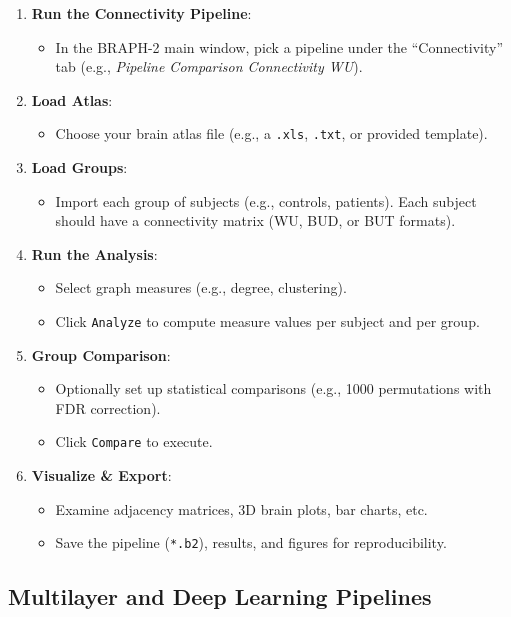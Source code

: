 \documentclass[justified]{tufte-handout}
\begin{document}
\begin{enumerate}
    \item \textbf{Run the Connectivity Pipeline}:
    \begin{itemize}
        \item In the BRAPH-2 main window, pick a pipeline under the ``Connectivity'' tab (e.g., \textit{Pipeline Comparison Connectivity WU}).
    \end{itemize}
    \item \textbf{Load Atlas}:
    \begin{itemize}
        \item Choose your brain atlas file (e.g., a \texttt{.xls}, \texttt{.txt}, or provided template).
    \end{itemize}
    \item \textbf{Load Groups}:
    \begin{itemize}
        \item Import each group of subjects (e.g., controls, patients). Each subject should have a connectivity matrix (WU, BUD, or BUT formats).
    \end{itemize}
    \item \textbf{Run the Analysis}:
    \begin{itemize}
        \item Select graph measures (e.g., degree, clustering).
        \item Click \texttt{Analyze} to compute measure values per subject and per group.
    \end{itemize}
    \item \textbf{Group Comparison}:
    \begin{itemize}
        \item Optionally set up statistical comparisons (e.g., 1000 permutations with FDR correction).
        \item Click \texttt{Compare} to execute.
    \end{itemize}
    \item \textbf{Visualize \& Export}:
    \begin{itemize}
        \item Examine adjacency matrices, 3D brain plots, bar charts, etc.
        \item Save the pipeline (\texttt{*.b2}), results, and figures for reproducibility.
    \end{itemize}
\end{enumerate}

\subsection{Multilayer and Deep Learning Pipelines}
\end{document}
